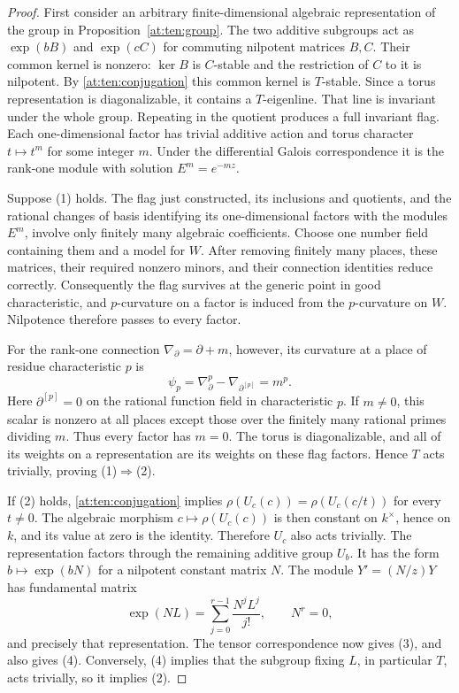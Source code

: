\documentclass[11pt,a4paper]{article}
\theoremstyle{definition}
\theoremstyle{remark}
\numberwithin{equation}{section}
\begin{document}
\begin{proof}
First consider an arbitrary finite-dimensional algebraic
representation of the group in Proposition~\ref{at:ten:group}.
The two additive subgroups act as $\exp(bB)$ and $\exp(cC)$ for
commuting nilpotent matrices $B,C$.  Their common kernel is nonzero:
$\ker B$ is $C$-stable and the restriction of $C$ to it is nilpotent.
By \eqref{at:ten:conjugation} this common kernel is $T$-stable.
Since a torus representation is diagonalizable, it contains a
$T$-eigenline.  That line is invariant under the whole group.
Repeating in the quotient produces a full invariant flag.
Each one-dimensional factor has trivial additive action and torus
character $t\mapsto t^m$ for some integer $m$.  Under the differential
Galois correspondence it is the rank-one module with solution
$E^m=e^{-mz}$.

Suppose (1) holds.  The flag just constructed, its inclusions and
quotients, and the rational changes of basis identifying its
one-dimensional factors with the modules $E^m$, involve only
finitely many algebraic coefficients.  Choose one number field
containing them and a model for $W$.  After removing finitely many
places, these matrices, their required nonzero minors, and their
connection identities reduce correctly.  Consequently the flag
survives at the generic point in good characteristic, and
$p$-curvature on a factor is induced from the $p$-curvature on $W$.
Nilpotence therefore passes to every factor.

For the rank-one connection $\nabla_\partial=\partial+m$, however,
its curvature at a place of residue characteristic $p$ is
\[
 \psi_p=\nabla_\partial^p-\nabla_{\partial^{[p]}}=m^p.
\]
Here $\partial^{[p]}=0$ on the rational function field in
characteristic $p$.  If $m\ne0$, this scalar is nonzero at all places
except those over the finitely many rational primes dividing $m$.
Thus every factor has $m=0$.  The torus is diagonalizable, and all
of its weights on a representation are its weights on these flag
factors.  Hence $T$ acts trivially, proving (1)$\Rightarrow$(2).

If (2) holds, \eqref{at:ten:conjugation} implies
$\rho(U_c(c))=\rho(U_c(c/t))$ for every $t\ne0$.
The algebraic morphism $c\mapsto\rho(U_c(c))$ is then constant on
$k^\times$, hence on $k$, and its value at zero is the identity.
Therefore $U_c$ also acts trivially.  The representation factors
through the remaining additive group $U_b$.  It has the form
$b\mapsto\exp(bN)$ for a nilpotent constant matrix $N$.
The module $Y'=(N/z)Y$ has fundamental matrix
\[
 \exp(NL)=\sum_{j=0}^{r-1}\frac{N^jL^j}{j!},\qquad N^r=0,
\]
and precisely that representation.  The tensor correspondence now
gives (3), and also gives (4).  Conversely, (4) implies that the
subgroup fixing $L$, in particular $T$, acts trivially, so it
implies (2).


\end{proof}
\end{document}
